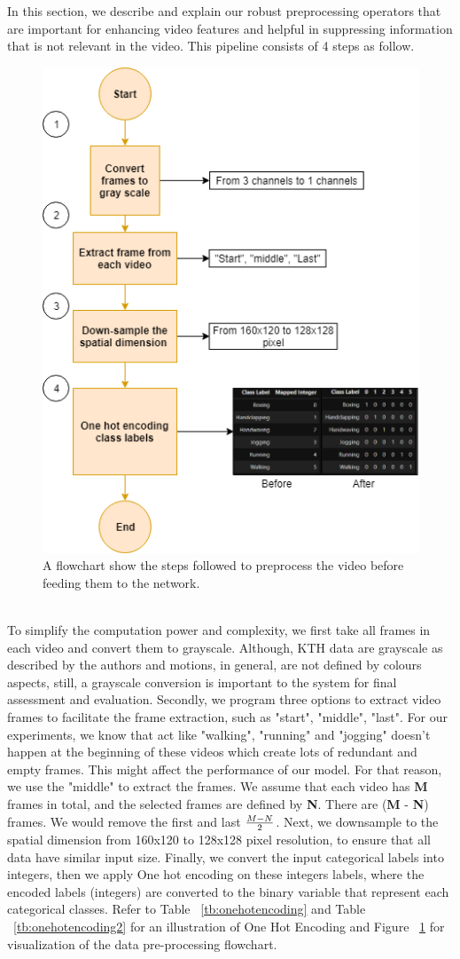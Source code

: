In this section, we describe and explain our robust preprocessing operators that are
important for enhancing video features and helpful in suppressing information that is not relevant in the video. This pipeline consists of 4 steps as follow.\\

\begin{figure}[ht]
\centering
\includegraphics[width=0.5\columnwidth]{Chapters/photos/fc.png}
\decoRule
\caption[A flowchart show the steps followed to preprocess the video before feeding them to the network.]{A flowchart show the steps followed to preprocess the video before feeding them to the network.}
\label{fig:datapreprocessingpipeline}
\end{figure}\\

To simplify the computation power and complexity, we first take all frames in each video and convert them to grayscale. Although, KTH data are grayscale as described by the authors and motions, in general, are not defined by colours aspects, still, a grayscale conversion is important to the system for final assessment and evaluation. Secondly, we program three options to extract video frames to facilitate the frame extraction, such as "start", "middle", "last". For our experiments, we know that act like "walking", "running" and "jogging" doesn't happen at the beginning of these videos which create lots of redundant and empty frames. This might affect the performance of our model. For that reason, we use the "middle" to extract the frames. We assume that each video has \textbf{M} frames in total, and the selected frames are defined by \textbf{N}. There are (\textbf{M} - \textbf{N}) frames. We would remove the first and last $\LARGE \frac{M-N}{2}$. Next, we downsample to the spatial dimension from 160x120 to 128x128 pixel resolution, to ensure that all data have similar input size. Finally, we convert the input categorical labels into integers, then we apply One hot encoding on these integers labels, where the encoded labels (integers) are converted to the binary variable that represent each categorical classes. Refer to Table ~\ref{tb:onehotencoding} and Table ~\ref{tb:onehotencoding2} for an illustration of One Hot Encoding and Figure ~\ref{fig:datapreprocessingpipeline} for visualization of the data pre-processing flowchart.


